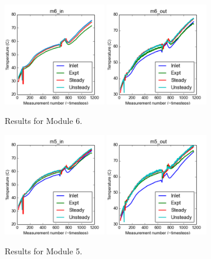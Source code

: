 \documentclass{article}
\begin{document}
\begin{figure}[!ht]
\centering
\includegraphics[width=0.4\textwidth]{../../data/ICSolar/images/Jan28_m6_in_compare.png}\hspace{0.05\textwidth}
\includegraphics[width=0.4\textwidth]{../../data/ICSolar/images/Jan28_m6_out_compare.png}\hspace{0.05\textwidth}\\
\caption{Results for Module 6.}\end{figure}
\begin{figure}[!ht]
\centering
\includegraphics[width=0.4\textwidth]{../../data/ICSolar/images/Jan28_m5_in_compare.png}\hspace{0.05\textwidth}
\includegraphics[width=0.4\textwidth]{../../data/ICSolar/images/Jan28_m5_out_compare.png}\hspace{0.05\textwidth}\\
\caption{Results for Module 5.}\end{figure}
\end{document}
